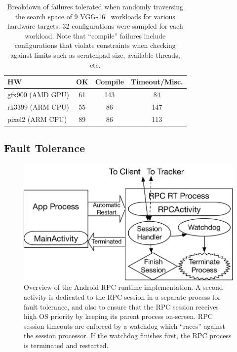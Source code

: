 \begin{table}[t]
\centering
\begin{tabular}{l|c|c|c}
\hline
HW&OK&Compile&Timeout/Misc.\\
\hline
gfx900 (AMD GPU)&61&143&84\\
rk3399 (ARM CPU)&55&86&147\\
pixel2 (ARM CPU)&89&86&113\\
\end{tabular}
\caption{Breakdown of failures tolerated when randomly traversing the search space of 9 VGG-16~\cite{simonyan2014very} workloads for various hardware targets.
32 configurations were sampled for each workload. Note that ``compile'' failures include configurations that violate constraints when checking against limits such as scratchpad size, available threads, etc.}\label{tbl:fault_tolerance}
\end{table}


\subsection{Fault Tolerance}

\begin{figure}[t!]
\includegraphics[width=\textwidth]{sys_diagrams/android.pdf}
\caption{Overview of the Android RPC runtime implementation.
  A second activity is dedicated to the RPC session in a separate process for fault tolerance, and also to ensure that the RPC session receives high OS priority by keeping its parent process on-screen. RPC session timeouts are enforced by a watchdog which ``races'' against the session processor.
  If the watchdog finishes first, the RPC process is terminated and restarted.}
\label{fig:android}
\end{figure}

